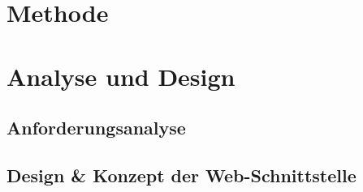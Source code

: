 \documentclass[draft,final]{vutinfth} %
\begin{document}
%	
%		
%		
%	









\chapter{Methode}



\chapter{Analyse und Design}

\section{Anforderungsanalyse}

\section{Design \& Konzept der Web-Schnittstelle}
\end{document}
